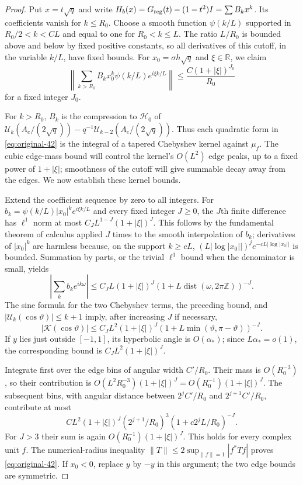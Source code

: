 \begin{proof}
Put $x=t\sqrt q$ and write
$H_b(x)=G_{\rm reg}(t)-(1-t^2)I=\sum B_kx^k$.
Its coefficients vanish for $k\le R_0$.
Choose a smooth function $\psi(k/L)$ supported in
$R_0/2<k<C L$ and equal to one for $R_0<k\le L$.
The ratio $L/R_0$ is bounded above and below by fixed positive
constants, so all derivatives of this cutoff, in the variable $k/L$,
have fixed bounds.  For $x_0=\sigma h\sqrt q$ and $\xi\in\mathbb R$,
we claim
\begin{equation}
 \left\|\sum_{k>R_0}B_kx_0^k\psi(k/L)e^{i\xi k/L}\right\|
 \le \frac{C(1+|\xi|)^{J_0}}{R_0}
 \label{eq:original-42}
\end{equation}
for a fixed integer $J_0$.

For $k>R_0$, $B_k$ is the compression to $\mathcal H_0$ of
$\mathcal U_k(A_e/(2\sqrt q))-q^{-1}\mathcal U_{k-2}(A_e/(2\sqrt q))$.
Thus each quadratic form in \eqref{eq:original-42} is the integral of
a tapered Chebyshev kernel against $\mu_f$.  The cubic edge-mass bound
will control the kernel's $O(L^2)$ edge peaks, up to a fixed power of
$1+|\xi|$; smoothness of the cutoff will give summable decay away
from the edges.  We now establish these kernel bounds.

Extend the coefficient
sequence by zero to all integers.  For
$b_k=\psi(k/L)|x_0|^ke^{i\xi k/L}$ and every fixed integer $J\ge0$,
the $J$th finite difference has $\ell^1$ norm at most
$C_JL^{1-J}(1+|\xi|)^J$.
This follows by the fundamental theorem of calculus applied $J$
times to the smooth interpolation of $b_k$; derivatives of
$|x_0|^k$ are harmless because, on the support $k\ge cL$,
$(L|\log|x_0||)^j e^{-cL|\log|x_0||}$ is bounded.
Summation by parts, or the trivial $\ell^1$ bound when the denominator
is small, yields
\[
 \left|\sum_kb_ke^{ik\omega}\right|
 \le C_J L(1+|\xi|)^J
   (1+L\operatorname{dist}(\omega,2\pi\mathbb Z))^{-J}.
\]
The sine formula for the two Chebyshev terms, the preceding
bound, and $|\mathcal U_k(\cos\vartheta)|\le k+1$ imply, after
increasing $J$ if necessary,
\[
 |\mathcal K(\cos\vartheta)|
 \le C_JL^2(1+|\xi|)^J
   (1+L\min(\vartheta,\pi-\vartheta))^{-J}.
\]
If $y$ lies just outside $[-1,1]$, its hyperbolic angle is
$O(\alpha_*)$; since $L\alpha_*=o(1)$, the corresponding bound is
$C_JL^2(1+|\xi|)^J$.

Integrate first over the edge bins of angular width $C'/R_0$.
Their mass is $O(R_0^{-3})$, so their contribution is
$O(L^2R_0^{-3})(1+|\xi|)^J=O(R_0^{-1})(1+|\xi|)^J$.
The subsequent bins, with angular distance between
$2^jC'/R_0$ and $2^{j+1}C'/R_0$, contribute at most
\[
 C L^2(1+|\xi|)^J
       (2^{j+1}/R_0)^3(1+c2^jL/R_0)^{-J}.
\]
For $J>3$ their sum is again $O(R_0^{-1})(1+|\xi|)^J$.
This holds for every complex unit $f$.  The numerical-radius
inequality $\|T\|\le2\sup_{\|f\|=1}|f^*Tf|$ proves
\eqref{eq:original-42}.  If $x_0<0$, replace $y$ by $-y$ in this
argument; the two edge bounds are symmetric.


\end{proof}
